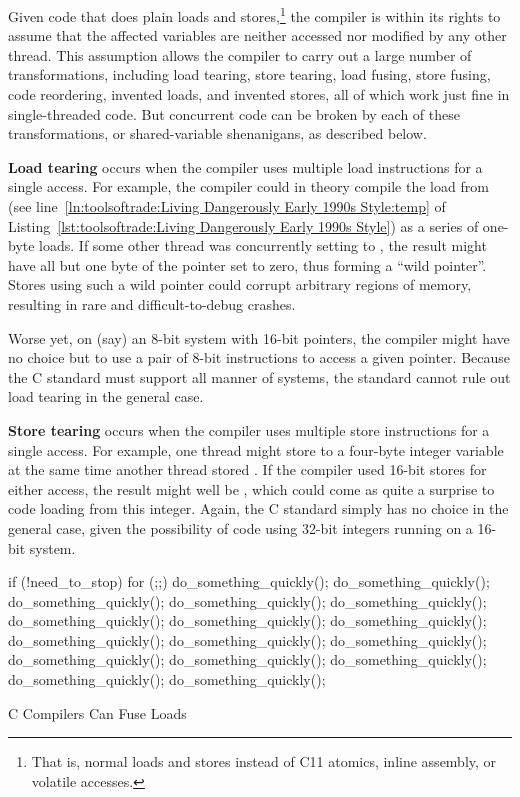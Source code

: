 Given code that does plain loads and stores,\footnote{
	That is, normal loads and stores instead of C11 atomics, inline
	assembly, or volatile accesses.}
the compiler is within
its rights to assume that the affected variables are neither accessed
nor modified by any other thread.
This assumption allows the compiler to carry out a large number of
transformations, including load tearing, store tearing,
load fusing, store fusing, code reordering, invented loads, and
invented stores, all of which work just fine in single-threaded code.
But concurrent code can be broken by each of these transformations,
or shared-variable shenanigans, as described below.

{\bf Load tearing} occurs when the compiler uses multiple load
instructions for a single access.
For example, the compiler could in theory compile the load from
 (see
line~\ref{ln:toolsoftrade:Living Dangerously Early 1990s Style:temp} of
Listing~\ref{lst:toolsoftrade:Living Dangerously Early 1990s Style})
as a series of one-byte loads.
If some other thread was concurrently setting  to
, the result might have all but one byte of the pointer
set to zero, thus forming a ``wild pointer''.
Stores using such a wild pointer could corrupt arbitrary
regions of memory, resulting in rare and difficult-to-debug crashes.

Worse yet, on (say) an 8-bit system with 16-bit pointers, the compiler
might have no choice but to use a pair of 8-bit instructions to access
a given pointer.
Because the C standard must support all manner of systems, the standard
cannot rule out load tearing in the general case.

{\bf Store tearing} occurs when the compiler uses multiple store
instructions for a single access.
For example, one thread might store  to a four-byte integer
variable at the same time another thread stored .
If the compiler used 16-bit stores for either access, the result
might well be , which could come as quite a surprise to
code loading from this integer.
Again, the C standard simply has no choice in the general case, given
the possibility of code using 32-bit integers running on a 16-bit system.

\begin{listing}[tbp]
\begin{linelabel}
\begin{VerbatimL}[commandchars=\\\[\]]
if (!need_to_stop)
	for (;;) {\lnlbl[loop:b]
		do_something_quickly();
		do_something_quickly();
		do_something_quickly();
		do_something_quickly();
		do_something_quickly();
		do_something_quickly();
		do_something_quickly();
		do_something_quickly();
		do_something_quickly();
		do_something_quickly();
		do_something_quickly();
		do_something_quickly();
		do_something_quickly();
		do_something_quickly();
		do_something_quickly();
		do_something_quickly();
	}\lnlbl[loop:e]
\end{VerbatimL}
\end{linelabel}
\caption{C Compilers Can Fuse Loads}
\label{lst:toolsoftrade:C Compilers Can Fuse Loads}
\end{listing}

